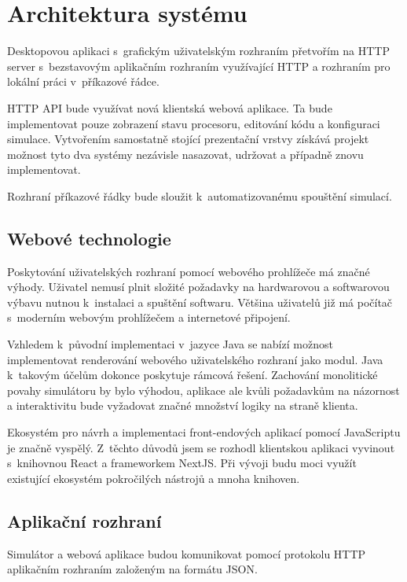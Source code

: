 \section{Architektura systému}

Desktopovou aplikaci s~grafickým uživatelským rozhraním přetvořím na HTTP server s~bezstavovým aplikačním rozhraním využívající HTTP a rozhraním pro lokální práci v~příkazové řádce.

HTTP API bude využívat nová klientská webová aplikace.
Ta bude implementovat pouze zobrazení stavu procesoru, editování kódu a konfiguraci simulace.
Vytvořením samostatně stojící prezentační vrstvy získává projekt možnost tyto dva systémy nezávisle nasazovat, udržovat a případně znovu implementovat.

Rozhraní příkazové řádky bude sloužit k~automatizovanému spouštění simulací.

\subsection{Webové technologie}

Poskytování uživatelských rozhraní pomocí webového prohlížeče má značné výhody.
Uživatel nemusí plnit složité požadavky na hardwarovou a softwarovou výbavu nutnou k~instalaci a spuštění softwaru.
Většina uživatelů již má počítač s~moderním webovým prohlížečem a internetové připojení.

Vzhledem k~původní implementaci v~jazyce Java se nabízí možnost implementovat renderování webového uživatelského rozhraní jako modul.
Java k~takovým účelům dokonce poskytuje rámcová řešení.
Zachování monolitické povahy simulátoru by bylo výhodou, aplikace ale kvůli požadavkům na názornost a interaktivitu bude vyžadovat značné množství logiky na straně klienta.

Ekosystém pro návrh a implementaci front-endových aplikací pomocí JavaScriptu je značně vyspělý.
Z~těchto důvodů jsem se rozhodl klientskou aplikaci vyvinout s~knihovnou React a frameworkem NextJS.
Při vývoji budu moci využít existující ekosystém pokročilých nástrojů a mnoha knihoven.

\subsection{Aplikační rozhraní}
\label{httpapidesign}

Simulátor a webová aplikace budou komunikovat pomocí protokolu HTTP aplikačním rozhraním založeným na formátu JSON. 

